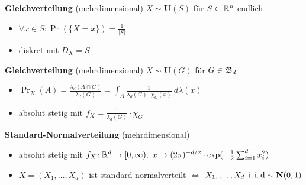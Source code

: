 \textbf{Gleichverteilung} (mehrdimensional) $X\sim\mathbf{U}(S)$ für $S\subset\mathbb{R}^n$
\underline{endlich}
\begin{itemize}
\item $\forall x\in S\!: \Pr(\{X=x\}) = \frac{1}{|S|}$

\item diskret mit $D_X = S$
\end{itemize}

\textbf{Gleichverteilung} (mehrdimensional) $X\sim\mathbf{U}(G)$ für $G\in\mathfrak{B}_d$
\begin{itemize}
\item $\Pr_X(A) = \frac{\lambda_d(A\cap G)}{\lambda_d(G)} =
  \int_A \frac{1}{\lambda_d(G) \cdot \chi_G(x)}~d\lambda(x)$

\item absolut stetig mit $f_X = \frac{1}{\lambda_d(G)} \cdot \chi_G$
\end{itemize}

\textbf{Standard-Normalverteilung} (mehrdimensional)
\begin{itemize}
\item absolut stetig mit
  $f_X\!: \mathbb{R}^d \to [0,\infty),\
  x \mapsto (2\pi)^{-d/2} \cdot \exp(-\frac{1}{2} \sum_{i=1}^{d}x_i^2)$

\item $X = (X_1,\ldots,X_d)$ ist standard-normalverteilt
  $\Leftrightarrow$ $X_1,\ldots,X_d\ \operatorname{i.i.d} \sim\mathbf{N}(0,1)$
\end{itemize}
